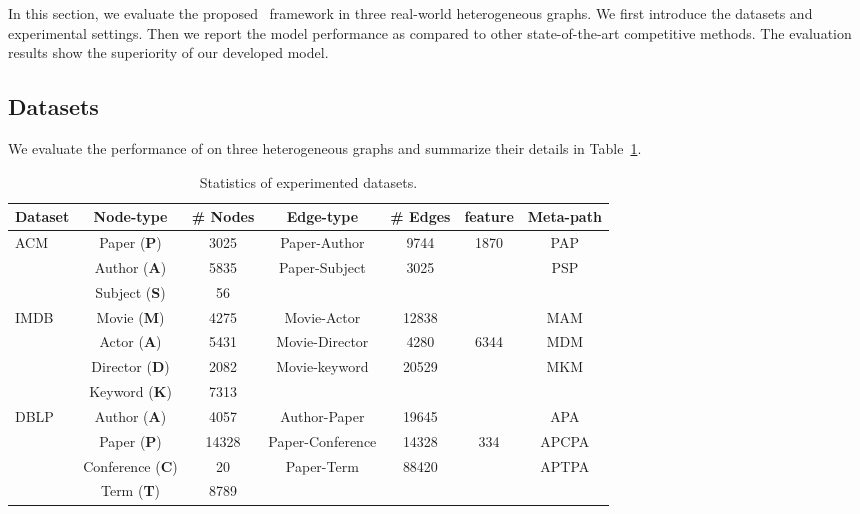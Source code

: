 \documentclass[conference]{IEEEtran}
\begin{document}
In this section, we evaluate the proposed \our\ framework in three real-world heterogeneous graphs. We first introduce the datasets and experimental settings. Then we report the model performance as compared to other state-of-the-art competitive methods. The evaluation results show the superiority of our developed model.
	
	
	\subsection{Datasets}
We evaluate the performance of {\our} on three heterogeneous graphs and summarize their details in Table~\ref{tab:dataset}. 
	
	\begin{table}[h]
\centering
\caption{Statistics of experimented datasets.}
\tiny
\begin{tabular}{l|ccccc|c}
			\toprule
Dataset  & Node-type & \# Nodes & Edge-type & \# Edges & feature & Meta-path\\
			\midrule
			\multirow{3}{*}{ACM} & Paper (\textbf{P}) & 3025 & \multirow{1.8}{*}{Paper-Author} & \multirow{1.8}{*}{9744} & \multirow{1.8}{*}{1870} &  \multirow{1.8}{*}{PAP}  \\
			& Author (\textbf{A})  & 5835 & \multirow{1.8}{*}{Paper-Subject}  & \multirow{1.8}{*}{3025} & & \multirow{1.8}{*}{PSP} \\
			& Subject (\textbf{S})  & 56 &  & & & \\
			\midrule
			\multirow{4}{*}{IMDB} & Movie (\textbf{M}) & 4275 & \multirow{1.8}{*}{Movie-Actor} & \multirow{1.8}{*}{12838} &  &  \multirow{1.8}{*}{MAM} \\
			& Actor (\textbf{A}) & 5431 & \multirow{1.8}{*}{Movie-Director}  & \multirow{1.8}{*}{4280} & \multirow{2}{*}{6344}& \multirow{1.8}{*}{MDM}\\
			& Director (\textbf{D}) & 2082 &\multirow{1.8}{*}{Movie-keyword}  & \multirow{1.8}{*}{20529} & & \multirow{1.8}{*}{MKM}\\
			& Keyword (\textbf{K}) & 7313 &  &  & &\\
			\midrule
			\multirow{4}{*}{DBLP} & Author (\textbf{A}) & 4057 & \multirow{1.8}{*}{Author-Paper} & \multirow{1.8}{*}{19645} &  &  \multirow{1.8}{*}{APA} \\
			& Paper (\textbf{P}) & 14328 & \multirow{1.8}{*}{Paper-Conference}  & \multirow{1.8}{*}{14328}& \multirow{2}{*}{334} & \multirow{1.8}{*}{APCPA} \\
			& Conference (\textbf{C}) & 20 &\multirow{1.8}{*}{Paper-Term}  & \multirow{1.8}{*}{88420} & & \multirow{1.8}{*}{APTPA}\\
			& Term (\textbf{T}) & 8789 &  & & & \\
\bottomrule
		\end{tabular}
\label{tab:dataset}
	\end{table}
	
\end{document}
